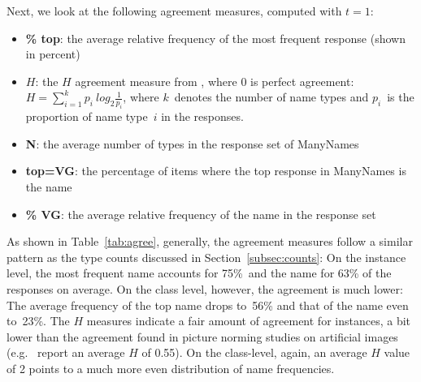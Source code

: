 Next, we look at the following agreement measures, computed with $t=1$: %
{\small
\begin{itemize}
\item \textbf{\% top}: the average relative frequency of the most frequent response (shown in percent)
\item \textbf{$H$}: the $H$ agreement measure from \citet{snodgrass}, where 0 is perfect agreement: \mbox{$H = \sum_{i=1}^k p_i~log_2\frac{1}{p_i}$}, 
where $k$\ denotes the number of name types and $p_i$\ is the proportion of name type\ $i$ in the responses.%
\item \textbf{N}: the average number of types in the response set of ManyNames
\item \textbf{top=VG}: the percentage of items where the top response in ManyNames is the \vg name 
\item \textbf{\% VG}: the average relative frequency of the \vg name in the response set 
\end{itemize}
}

As shown in Table\ \ref{tab:agree}, generally, the agreement measures follow a similar pattern as the type counts discussed in Section\ \ref{subsec:counts}:
On the instance level, %
the most frequent name accounts for 75\%\  and the \vg name for 63\% of the responses on average. On the class level, however, the agreement is much lower: The average frequency of the top name drops to\ 56\% and that of the \vg name even to\ 23\%. The $H$ measures indicate a fair amount of agreement for instances, a bit lower than the agreement found in picture norming studies on artificial images (e.g.\  report an average $H$ of 0.55). On the class-level, again, an average $H$ value of 2 points to a much more even distribution of name frequencies.

